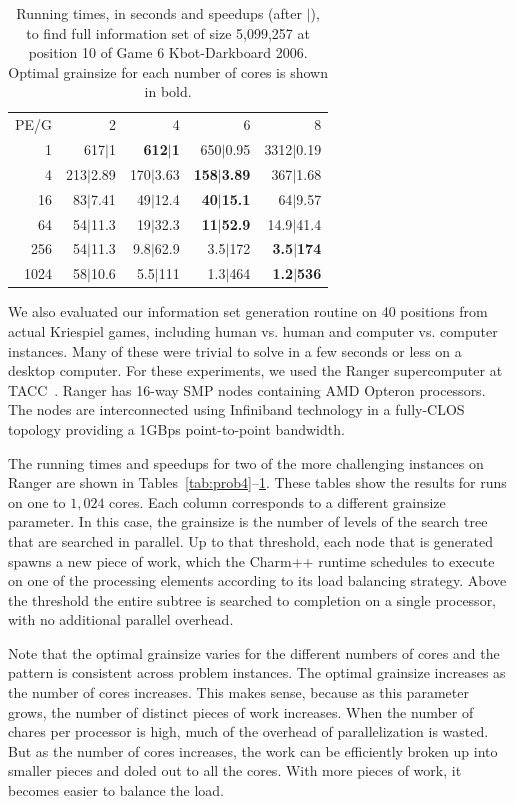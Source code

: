 \documentclass[10pt, conference, compsocconf]{IEEEtran}
\begin{document}
\begin{table}[th]

\caption{Running times, in seconds and speedups (after $|$), to find full
information set of size 5,099,257 at position 10 of Game 6 Kbot-Darkboard 2006.
Optimal grainsize for each number of cores is shown in bold.}
\centering
\begin{tabular}{rrrrr}
PE/G & 2 & 4 & 6 & 8 \\
1 & 617$|$1 & {\bf 612$|$1} & 650$|$0.95 & 3312$|$0.19 \\
4 & 213$|$2.89 & 170$|$3.63 & {\bf 158$|$3.89} & 367$|$1.68 \\
16 & 83$|$7.41 & 49$|$12.4 & {\bf 40$|$15.1} & 64$|$9.57 \\
64 & 54$|$11.3 & 19$|$32.3 & {\bf 11$|$52.9} & 14.9$|$41.4 \\
256 & 54$|$11.3 & 9.8$|$62.9 & 3.5$|$172 & {\bf 3.5$|$174} \\
1024 & 58$|$10.6 & 5.5$|$111 & 1.3$|$464 & {\bf 1.2$|$536} \\
\end{tabular}

\label{tab:prob5}
\end{table}

We also evaluated our information set generation routine on 40 positions from
actual Kriespiel games, including human vs. human and computer vs. computer
instances.  Many of these were trivial to solve in a few seconds or less on a
desktop computer.  For these experiments, we used the Ranger supercomputer
at TACC~\cite{ranger}. Ranger has 16-way SMP nodes containing AMD Opteron
processors. The nodes are interconnected using Infiniband technology in a
fully-CLOS topology providing a 1GBps point-to-point bandwidth. 

The running times and speedups for two of the more challenging instances on
Ranger are shown in Tables~\ref{tab:prob4}--\ref{tab:prob5}.   These tables
show the results for runs on one to $1,024$ cores.  Each column corresponds to
a different grainsize parameter.  In this case, the grainsize is the number of
levels of the search tree that are searched in parallel.  Up to that threshold,
each node that is generated spawns a new piece of work, which the {\sc Charm++}
runtime schedules to execute on one of the processing elements according to its
load balancing strategy.  Above the threshold the entire subtree is searched to
completion on a single processor, with no additional parallel overhead. 

Note that the optimal grainsize varies for the different numbers of cores and
the pattern is consistent across problem instances.  The optimal
grainsize increases as the number of cores increases.  This makes sense,
because as this parameter grows, the number of distinct pieces of work
increases.  When the number of chares per processor is high, much of
the overhead of parallelization is wasted.  But as the number of cores
increases, the work can be efficiently broken up into smaller pieces and doled
out to all the cores.  With more pieces of work, it becomes easier to balance
the load.
\end{document}
